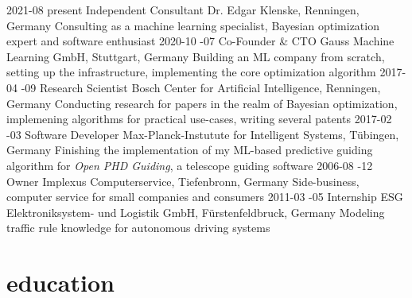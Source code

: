 \documentclass[a4paper]{k-cv} %
\begin{document}
\begin{entrylist}
  \entry
  {2021-08 \to present}
  {Independent Consultant}
  {Dr. Edgar Klenske, Renningen, Germany}
  {Consulting as a machine learning specialist, Bayesian optimization expert and
    software enthusiast}
  \entry
  {2020-10 -07}
  {Co-Founder \& CTO}
  {Gauss Machine Learning GmbH, Stuttgart, Germany}
  {Building an ML company from scratch, setting up the infrastructure,
    implementing the core optimization algorithm}
  \entry
  {2017-04 -09}
  {Research Scientist}
  {Bosch Center for Artificial Intelligence, Renningen, Germany}
  {Conducting research for papers in the realm of Bayesian optimization,
    implemening algorithms for practical use-cases, writing several patents}
  \entry
  {2017-02 -03}
  {Software Developer}
  {Max-Planck-Instutute for Intelligent Systems, T\"ubingen, Germany}
  {Finishing the implementation of my ML-based predictive guiding algorithm for
    \emph{Open PHD Guiding}, a telescope guiding software}
  \entry
  {2006-08 -12}
  {Owner}
  {Implexus Computerservice, Tiefenbronn, Germany}
  {Side-business, computer service for small companies and consumers}
  \entry
  {2011-03 -05}
  {Internship}
  {ESG Elektroniksystem- und Logistik GmbH, F\"urstenfeldbruck, Germany}
  {Modeling traffic rule knowledge for autonomous driving systems}
\end{entrylist}

\section{education}\normalfont
\end{document}
